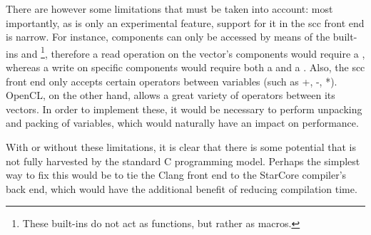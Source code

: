 There are however some limitations that must be taken into account: most importantly, as \vectype{} is only an experimental feature, support for it in the scc front end is narrow. For instance, \vectype{} components can only be accessed by means of the built-ins \vpack{}  and \vunpack{}\footnote{These built-ins do not act as functions, but rather as macros.}, therefore a read operation on the vector's components would require a \vunpack{}, whereas a write on specific components would require both a \vunpack{}  and a \vpack{}. Also, the scc front end only accepts certain operators between \vectype{} variables (such as +, -, *). OpenCL, on the other hand, allows a great variety of operators between its vectors. In order to implement these, it would be necessary to perform unpacking and packing of \vectype{} variables, which would naturally have an impact on performance.

With or without these limitations, it is clear that there is some potential that is not fully harvested by the standard C programming model. Perhaps the simplest way to fix this would be to tie the Clang front end to the StarCore compiler's back end, which would have the additional benefit of reducing compilation time. 
